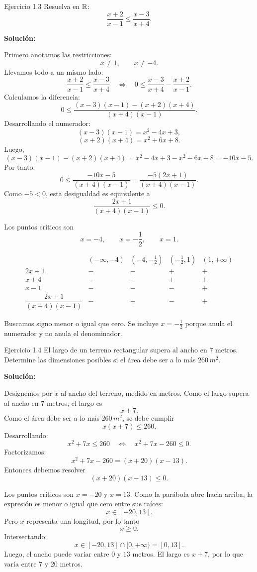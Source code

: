 \documentclass[letterpaper, 12pt]{article}
\begin{document}
\begin{solucionbox}{Ejercicio 1.3}
Resuelva en $\mathbb{R}$:
\[
    \frac{x+2}{x-1}\leq \frac{x-3}{x+4}.
\]

\textbf{Soluci\'on:}

Primero anotamos las restricciones:
\[
    x\neq 1,\qquad x\neq -4.
\]
Llevamos todo a un mismo lado:
\[
    \frac{x+2}{x-1}\leq \frac{x-3}{x+4}
    \quad\Longleftrightarrow\quad
    0\leq \frac{x-3}{x+4}-\frac{x+2}{x-1}.
\]
Calculamos la diferencia:
\[
    0\leq
    \frac{(x-3)(x-1)-(x+2)(x+4)}{(x+4)(x-1)}.
\]
Desarrollando el numerador:
\[
    (x-3)(x-1)=x^2-4x+3,
\]
\[
    (x+2)(x+4)=x^2+6x+8.
\]
Luego,
\[
    (x-3)(x-1)-(x+2)(x+4)
    =x^2-4x+3-x^2-6x-8=-10x-5.
\]
Por tanto:
\[
    0\leq \frac{-10x-5}{(x+4)(x-1)}
    =\frac{-5(2x+1)}{(x+4)(x-1)}.
\]
Como $-5<0$, esta desigualdad es equivalente a
\[
    \frac{2x+1}{(x+4)(x-1)}\leq 0.
\]

Los puntos cr\'iticos son
\[
    x=-4,\qquad x=-\frac12,\qquad x=1.
\]

\[
\begin{array}{c|cccc}
    & (-\infty,-4) & (-4,-\frac12) & (-\frac12,1) & (1,+\infty) \\ \hline
    2x+1 & - & - & + & + \\
    x+4 & - & + & + & + \\
    x-1 & - & - & - & + \\ \hline
    \dfrac{2x+1}{(x+4)(x-1)} & - & + & - & +
\end{array}
\]

Buscamos signo menor o igual que cero. Se incluye $x=-\frac12$ porque anula el numerador y no anula el denominador.

\respuesta{$x\in(-\infty,-4)\cup\left[-\dfrac12,1\right)$.}
\end{solucionbox}

\begin{solucionbox}{Ejercicio 1.4}
El largo de un terreno rectangular supera al ancho en $7$ metros. Determine las dimensiones posibles si el \'area debe ser a lo m\'as $260\,m^2$.

\textbf{Soluci\'on:}

Designemos por $x$ al ancho del terreno, medido en metros. Como el largo supera al ancho en $7$ metros, el largo es
\[
    x+7.
\]
Como el \'area debe ser a lo m\'as $260\,m^2$, se debe cumplir
\[
    x(x+7)\leq 260.
\]
Desarrollando:
\[
    x^2+7x\leq 260
    \quad\Longleftrightarrow\quad
    x^2+7x-260\leq 0.
\]
Factorizamos:
\[
    x^2+7x-260=(x+20)(x-13).
\]
Entonces debemos resolver
\[
    (x+20)(x-13)\leq 0.
\]

Los puntos cr\'iticos son $x=-20$ y $x=13$. Como la par\'abola abre hacia arriba, la expresi\'on es menor o igual que cero entre sus ra\'ices:
\[
    x\in[-20,13].
\]
Pero $x$ representa una longitud, por lo tanto
\[
    x\geq 0.
\]
Intersectando:
\[
    x\in[-20,13]\cap[0,+\infty)=[0,13].
\]
Luego, el ancho puede variar entre $0$ y $13$ metros. El largo es $x+7$, por lo que var\'ia entre $7$ y $20$ metros.

\end{solucionbox}
\end{document}
